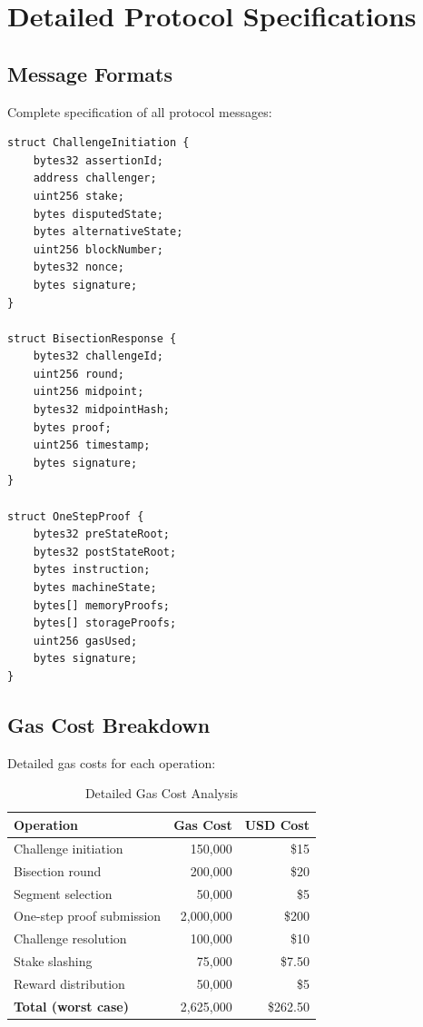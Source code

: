 \section{Detailed Protocol Specifications}


\subsection{Message Formats}

Complete specification of all protocol messages:

\begin{lstlisting}[language=Solidity, caption=Protocol Message Structures]
struct ChallengeInitiation {
    bytes32 assertionId;
    address challenger;
    uint256 stake;
    bytes disputedState;
    bytes alternativeState;
    uint256 blockNumber;
    bytes32 nonce;
    bytes signature;
}

struct BisectionResponse {
    bytes32 challengeId;
    uint256 round;
    uint256 midpoint;
    bytes32 midpointHash;
    bytes proof;
    uint256 timestamp;
    bytes signature;
}

struct OneStepProof {
    bytes32 preStateRoot;
    bytes32 postStateRoot;
    bytes instruction;
    bytes machineState;
    bytes[] memoryProofs;
    bytes[] storageProofs;
    uint256 gasUsed;
    bytes signature;
}
\end{lstlisting}

\subsection{Gas Cost Breakdown}

Detailed gas costs for each operation:

\begin{table}[h]
\centering
\caption{Detailed Gas Cost Analysis}
\begin{tabular}{lrr}
\toprule
\textbf{Operation} & \textbf{Gas Cost} & \textbf{USD Cost} \\
\midrule
Challenge initiation & 150,000 & \$15 \\
Bisection round & 200,000 & \$20 \\
Segment selection & 50,000 & \$5 \\
One-step proof submission & 2,000,000 & \$200 \\
Challenge resolution & 100,000 & \$10 \\
Stake slashing & 75,000 & \$7.50 \\
Reward distribution & 50,000 & \$5 \\
\midrule
\textbf{Total (worst case)} & 2,625,000 & \$262.50 \\
\bottomrule
\end{tabular}
\end{table}

